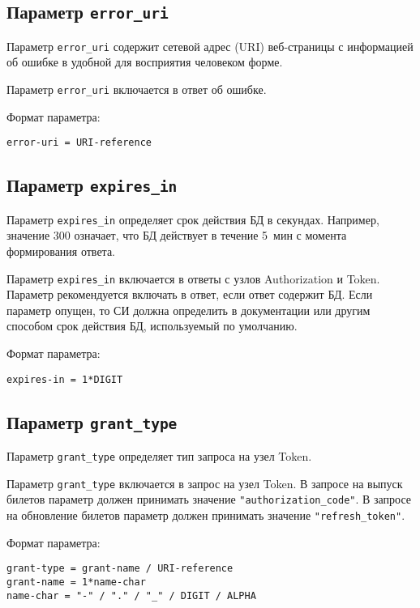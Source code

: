 \subsection{Параметр \lstinline{error_uri}}\label{PARAMS.ErrorUri}

Параметр \lstinline{error_uri} содержит сетевой адрес (URI) веб-страницы 
с информацией об ошибке в удобной для восприятия человеком форме.

Параметр \lstinline{error_uri} включается в ответ об ошибке.


Формат параметра:
\begin{lstlisting}
error-uri = URI-reference
\end{lstlisting}

\subsection{Параметр \lstinline{expires_in}}\label{PARAMS.ExpiresIn}

Параметр \lstinline{expires_in} определяет срок действия БД в секундах. 
%
Например, значение 300 означает, что БД действует в течение 5~мин с момента 
формирования ответа.

Параметр \lstinline{expires_in} включается в ответы с узлов Authorization и 
Token. 
%
Параметр рекомендуется включать в ответ, если ответ содержит БД.  
%
Если параметр опущен, то СИ должна определить в документации или другим способом
срок действия БД, используемый по умолчанию.

Формат параметра:
\begin{lstlisting}
expires-in = 1*DIGIT
\end{lstlisting}

\subsection{Параметр \lstinline{grant_type}}\label{PARAMS.GrantType}

Параметр \lstinline{grant_type} определяет тип запроса на узел Token.

Параметр \lstinline{grant_type} включается в запрос на узел Token.
%
В запросе на выпуск билетов параметр должен принимать значение 
\lstinline{"authorization_code"}.
%
В запросе на обновление билетов параметр должен принимать значение 
\lstinline{"refresh_token"}.

Формат параметра:
\begin{lstlisting}
grant-type = grant-name / URI-reference
grant-name = 1*name-char
name-char = "-" / "." / "_" / DIGIT / ALPHA
\end{lstlisting}

